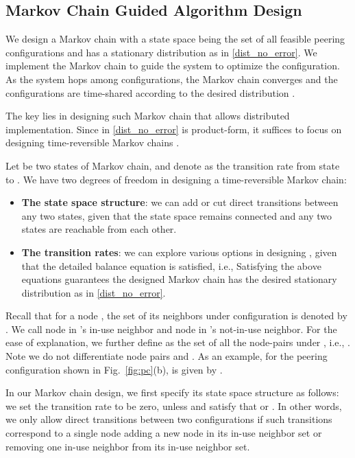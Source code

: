 \documentclass[10pt,conference]{IEEEtran}
\begin{document}
\subsection{Markov Chain Guided Algorithm Design}

We design a Markov chain with a state space being the set of all feasible peering configurations  and has a stationary distribution as  in \eqref{dist_no_error}. We implement the Markov chain to guide the system to optimize the configuration. As the system hops among configurations, the Markov chain converges and the configurations are time-shared according to the desired distribution .

The key lies in designing such Markov chain that allows distributed
implementation. Since  in \eqref{dist_no_error}
is product-form, it suffices to focus on designing time-reversible Markov chains
\cite{MA:CLSC10}.

Let  be two states of Markov chain, and denote
 as the transition rate from state 
to . We have two degrees of freedom in designing a time-reversible
Markov chain:
\begin{itemize}
\item \textbf{The state space structure}: we can add or
cut direct transitions between any two states, given that the state
space remains connected and any two states are reachable from each
other.
\item \textbf{The transition rates}: we can explore various options
in designing , given that the detailed balance
equation is satisfied, i.e., 
Satisfying the above equations guarantees the designed Markov chain has the desired stationary distribution
as in \eqref{dist_no_error}.
\end{itemize}

Recall that for a node , the set of its neighbors under configuration
 is denoted by . We call node in  's in-use neighbor and node in  's not-in-use neighbor. For the ease of explanation,
we further define  as the set of all the node-pairs under , i.e., . Note we do not differentiate node pairs  and .
As an example, for the peering configuration  shown in Fig.~\ref{fig:pc}(b),  is given by .

In our Markov chain design, we first specify its state space structure
as follows: we set the transition rate  to be zero, unless  and  satisfy that
 or .
In other words, we only allow direct transitions between two configurations
if such transitions correspond to a single node adding a new node in its in-use
neighbor set or removing one in-use neighbor from its in-use neighbor set.
\end{document}

